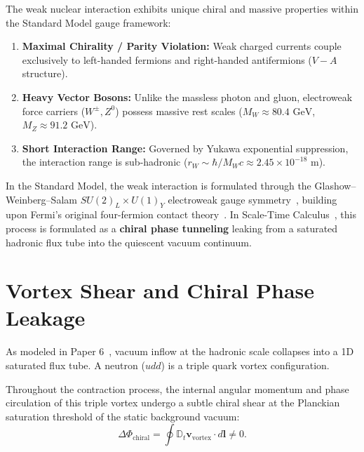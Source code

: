 \documentclass[11pt,a4paper]{article}
\begin{document}
The weak nuclear interaction exhibits unique chiral and massive properties within the Standard Model gauge framework:
\begin{enumerate}
    \item \textbf{Maximal Chirality / Parity Violation:} Weak charged currents couple exclusively to left-handed fermions and right-handed antifermions ($V-A$ structure).
    \item \textbf{Heavy Vector Bosons:} Unlike the massless photon and gluon, electroweak force carriers ($W^\pm, Z^0$) possess massive rest scales ($M_W \approx 80.4\text{ GeV}$, $M_Z \approx 91.2\text{ GeV}$).
    \item \textbf{Short Interaction Range:} Governed by Yukawa exponential suppression, the interaction range is sub-hadronic ($r_W \sim \hbar / M_W c \approx 2.45 \times 10^{-18}\text{ m}$).
\end{enumerate}

In the Standard Model, the weak interaction is formulated through the Glashow--Weinberg--Salam $SU(2)_L \times U(1)_Y$ electroweak gauge symmetry~\cite{weinberg1967,salam1968}, building upon Fermi's original four-fermion contact theory~\cite{fermi1934}. In Scale-Time Calculus~\cite{scale_calculus}, this process is formulated as a \textbf{chiral phase tunneling} leaking from a saturated hadronic flux tube into the quiescent vacuum continuum.

\section{Vortex Shear and Chiral Phase Leakage}
\label{sec:kiral_sizinti}

As modeled in Paper 6~\cite{paper6}, vacuum inflow at the hadronic scale collapses into a 1D saturated flux tube. A neutron ($udd$) is a triple quark vortex configuration.

Throughout the contraction process, the internal angular momentum and phase circulation of this triple vortex undergo a subtle chiral shear at the Planckian saturation threshold of the static background vacuum:
\begin{equation}
    \Delta \Phi_{\mathrm{chiral}} = \oint \mathbb{D}_t \mathbf{v}_{\mathrm{vortex}} \cdot d\mathbf{l} \neq 0.
    \label{eq:kiral_burulma_tr}
\end{equation}
\end{document}
